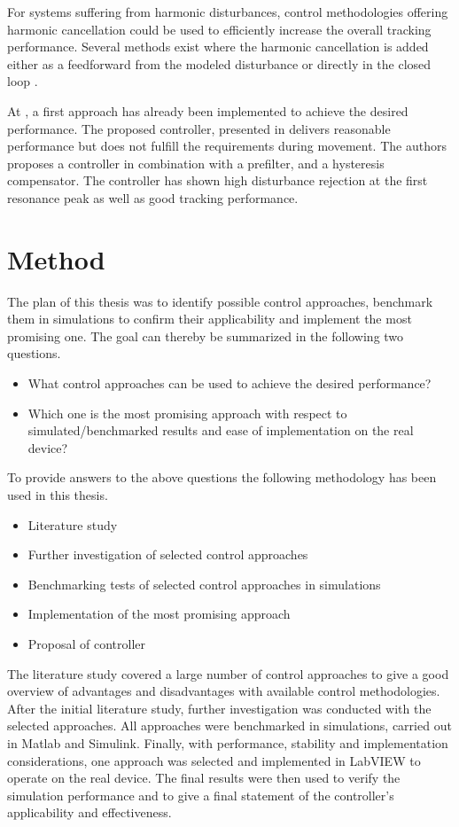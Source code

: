 For systems suffering from harmonic disturbances, control methodologies offering harmonic cancellation could be used to efficiently increase the overall tracking performance. Several methods exist where the harmonic cancellation is added either as a feedforward from the modeled disturbance \citep{fujimoto2009rro, vilanova2008disturbance} or directly in the closed loop \citep{IMP:Perry}.

At \abbrCERN, a first approach has already been implemented to achieve the desired performance. The proposed controller, presented in \citep{ButcherController:2015} delivers reasonable performance but does not fulfill the requirements during movement. The authors proposes a \abbrPID controller in combination with a prefilter, and a hysteresis compensator. The controller has shown high disturbance rejection at the first resonance peak as well as good tracking performance.

\section{Method}
The plan of this thesis was to identify possible control approaches, benchmark them in simulations to confirm their applicability and implement the most promising one. The goal can thereby be summarized in the following two questions.

\begin{itemize}
  \item What control approaches can be used to achieve the desired performance?
  \item Which one is the most promising approach with respect to simulated/benchmarked results and ease of implementation on the real device?
\end{itemize}

To provide answers to the above questions the following methodology has been used in this thesis.

\begin{itemize}
  \item Literature study
  \item Further investigation of selected control approaches
  \item Benchmarking tests of selected control approaches in simulations
  \item Implementation of the most promising approach
  \item Proposal of controller
\end{itemize}

The literature study covered a large number of control approaches to give a good overview of advantages and disadvantages with available control methodologies. After the initial literature study, further investigation was conducted with the selected approaches. All approaches were benchmarked in simulations, carried out in Matlab and Simulink. Finally, with performance, stability and implementation considerations, one approach was selected and implemented in LabVIEW to operate on the real device. The final results were then used to verify the simulation performance and to give a final statement of the controller's applicability and effectiveness.

